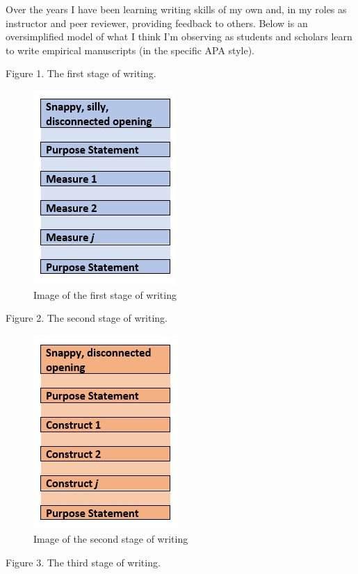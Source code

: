 \documentclass[
  11pt,
]{book}
\begin{document}
Over the years I have been learning writing skills of my own and, in my roles as instructor and peer reviewer, providing feedback to others. Below is an oversimplified model of what I think I'm observing as students and scholars learn to write empirical manuscripts (in the specific APA style).

Figure 1. The first stage of writing.

\begin{figure}
\centering
\includegraphics{images/APAstyle/Stage1.jpg}
\caption{Image of the first stage of writing}
\end{figure}

Figure 2. The second stage of writing.

\begin{figure}
\centering
\includegraphics{images/APAstyle/Stage2.jpg}
\caption{Image of the second stage of writing}
\end{figure}

Figure 3. The third stage of writing.
\end{document}
